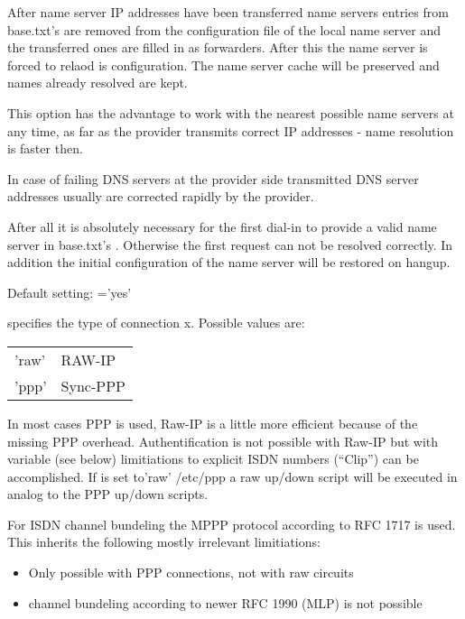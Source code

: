 \begin{description}
  After name server IP addresses have been transferred name servers entries from 
  base.txt's \emph{} are removed from the configuration 
  file of the local name server and the transferred ones are filled in as 
  forwarders. After this the name server is forced to relaod is configuration. 
  The name server cache will be preserved and names already resolved are kept.
  
  This option has the advantage to work with the nearest possible name servers 
  at any time, as far as the provider transmits correct IP addresses - name 
  resolution is faster then.
  
  In case of failing DNS servers at the provider side transmitted DNS server
  addresses usually are corrected rapidly by the provider.
  
  After all it is absolutely necessary for the first dial-in to provide a valid 
  name server in base.txt's \emph{}. Otherwise the first 
  request can not be resolved correctly. In addition the initial configuration 
  of the name server will be restored on hangup.
  
  Default setting: ='yes'


  
   specifies the type of connection x. Possible 
  values are:

  \begin{tabular}[h!]{ll}
        'raw' &           RAW-IP\\
        'ppp' &           Sync-PPP\\
  \end{tabular}
  
  In most cases PPP is used, Raw-IP is a little more efficient because 
  of the missing PPP overhead. Authentification is not possible with 
  Raw-IP but with variable  (see below) 
  limitiations to explicit ISDN numbers (``Clip'') can be accomplished. 
  If  is set to'raw' /etc/ppp a raw up/down 
  script will be executed in analog to the PPP up/down scripts.

  
  For ISDN channel bundeling the MPPP protocol according to RFC 1717 is used. 
  This inherits the following mostly irrelevant limitiations:
  \begin{itemize}
  \item Only possible with PPP connections, not with raw circuits
  \item channel bundeling according to newer RFC 1990 (MLP) is not possible
  \end{itemize}
  

\end{description}
